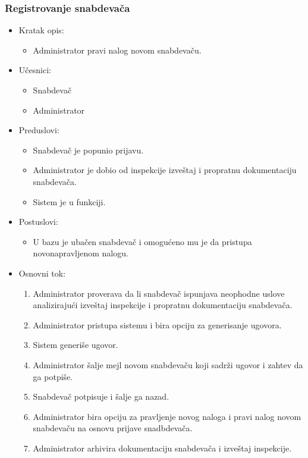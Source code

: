 \subsubsection{Registrovanje snabdevača}

\begin{itemize}
	\item Kratak opis:
		\begin{itemize}
			\item Administrator pravi nalog novom snabdevaču.
		\end{itemize}
	\item Učesnici:
		\begin{itemize}
			\item Snabdevač
			\item Administrator
		\end{itemize}				
	\item Preduslovi:
		\begin{itemize}
		    \item Snabdevač je popunio prijavu.
		    \item Administrator je dobio od inspekcije izveštaj i propratnu dokumentaciju snabdevača. %
		    \item Sistem je u funkciji.
		\end{itemize}
	\item Postuslovi:
		\begin{itemize}
			\item U bazu je ubačen snabdevač i omogućeno mu je da pristupa novonapravljenom nalogu.
		\end{itemize}		
	\item Osnovni tok:
		\begin{enumerate}
		    \item Administrator proverava da li snabdevač ispunjava neophodne uslove analizirajući izveštaj inspekcije i propratnu dokumentaciju snabdevača.
		    \item Administrator pristupa sistemu i bira opciju za generisanje ugovora. 
		    \item Sistem generiše ugovor.
		    \item Administrator šalje mejl novom snabdevaču koji sadrži ugovor i zahtev da ga potpiše.
		    \item Snabdevač potpisuje i šalje ga nazad.
		    \item Administrator bira opciju za pravljenje novog naloga i pravi nalog novom snabdevaču na osnovu prijave snadbdevača.
		    \item Administrator arhivira dokumentaciju snabdevača i izveštaj inspekcije.

\end{enumerate}
\end{itemize}
